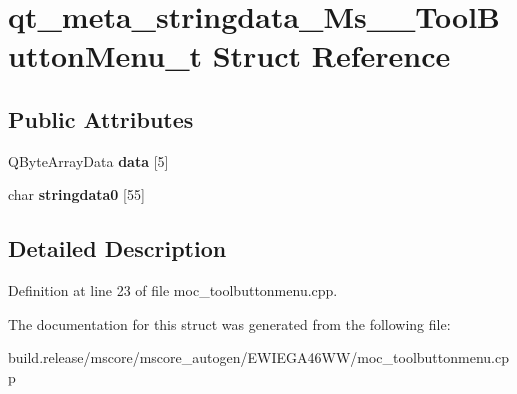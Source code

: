 \hypertarget{structqt__meta__stringdata___ms_____tool_button_menu__t}{}\section{qt\+\_\+meta\+\_\+stringdata\+\_\+\+Ms\+\_\+\+\_\+\+Tool\+Button\+Menu\+\_\+t Struct Reference}
\label{structqt__meta__stringdata___ms_____tool_button_menu__t}
\subsection*{Public Attributes}
\begin{DoxyCompactItemize}
\item 
\mbox{\label{structqt__meta__stringdata___ms_____tool_button_menu__t_ab37a59d2477e954033ebb8c9a482426d}} 
Q\+Byte\+Array\+Data {\bfseries data} \mbox{[}5\mbox{]}
\item 
\mbox{\label{structqt__meta__stringdata___ms_____tool_button_menu__t_aa4327847b0b17057cb67706b94c66a9b}} 
char {\bfseries stringdata0} \mbox{[}55\mbox{]}
\end{DoxyCompactItemize}


\subsection{Detailed Description}


Definition at line 23 of file moc\+\_\+toolbuttonmenu.\+cpp.



The documentation for this struct was generated from the following file\+:\begin{DoxyCompactItemize}
\item 
build.\+release/mscore/mscore\+\_\+autogen/\+E\+W\+I\+E\+G\+A46\+W\+W/moc\+\_\+toolbuttonmenu.\+cpp\end{DoxyCompactItemize}
